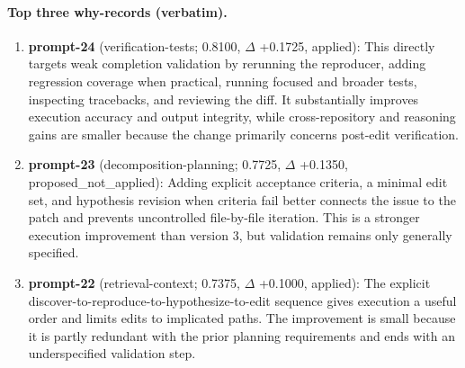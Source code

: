 \paragraph{Top three why-records (verbatim).}\begin{enumerate}\itemsep1pt
\item \textbf{prompt-24} (verification-tests; 0.8100, $\Delta$ +0.1725, applied): This directly targets weak completion validation by rerunning the reproducer, adding regression coverage when practical, running focused and broader tests, inspecting tracebacks, and reviewing the diff. It substantially improves execution accuracy and output integrity, while cross-repository and reasoning gains are smaller because the change primarily concerns post-edit verification.
\item \textbf{prompt-23} (decomposition-planning; 0.7725, $\Delta$ +0.1350, proposed\_not\_applied): Adding explicit acceptance criteria, a minimal edit set, and hypothesis revision when criteria fail better connects the issue to the patch and prevents uncontrolled file-by-file iteration. This is a stronger execution improvement than version 3, but validation remains only generally specified.
\item \textbf{prompt-22} (retrieval-context; 0.7375, $\Delta$ +0.1000, applied): The explicit discover-to-reproduce-to-hypothesize-to-edit sequence gives execution a useful order and limits edits to implicated paths. The improvement is small because it is partly redundant with the prior planning requirements and ends with an underspecified validation step.
\end{enumerate}
